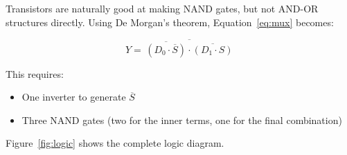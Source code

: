 \documentclass[11pt,a4paper]{article}
\begin{document}
Transistors are naturally good at making NAND gates, but not AND-OR structures directly. Using De Morgan's theorem, Equation~\eqref{eq:mux} becomes:

\begin{equation}
Y = \overline{\,\overline{(D_0 \cdot \overline{S})} \cdot \overline{(D_1 \cdot S)}\,}
\label{eq:nand}
\end{equation}

This requires:
\begin{itemize}[leftmargin=2em]
  \item One inverter to generate $\overline{S}$
  \item Three NAND gates (two for the inner terms, one for the final combination)
\end{itemize}

Figure~\ref{fig:logic} shows the complete logic diagram.
\end{document}
